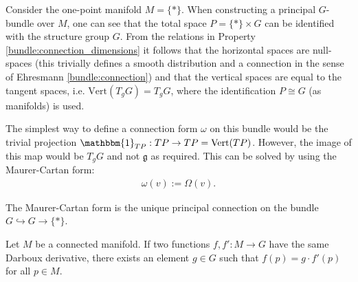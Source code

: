     \begin{construct}
        Consider the one-point manifold $M=\{\ast\}$. When constructing a principal $G$-bundle over $M$, one can see that the total space $P=\{\ast\}\times G$ can be identified with the structure group $G$. From the relations in Property \ref{bundle:connection_dimensions} it follows that the horizontal spaces are null-spaces (this trivially defines a smooth distribution and a connection in the sense of Ehresmann \ref{bundle:connection}) and that the vertical spaces are equal to the tangent spaces, i.e. $\mathrm{Vert}(T_gG)=T_gG$, where the identification $P\cong G$ (as manifolds) is used.

        The simplest way to define a connection form $\omega$ on this bundle would be the trivial projection $\mathbbm{1}_{TP}:TP\rightarrow TP=\mathrm{Vert}(TP)$. However, the image of this map would be $T_gG$ and not $\mathfrak{g}$ as required. This can be solved by using the Maurer-Cartan form:
        \begin{gather}
            \omega(v) := \Omega(v).
        \end{gather}
    \end{construct}
    \begin{property}
        The Maurer-Cartan form is the unique principal connection on the bundle $G\hookrightarrow G\rightarrow\{\ast\}$.
    \end{property}

    \begin{property}
        Let $M$ be a connected manifold. If two functions $f,f':M\rightarrow G$ have the same Darboux derivative, there exists an element $g\in G$ such that $f(p)=g\cdot f'(p)$ for all $p\in M$.
    \end{property}

